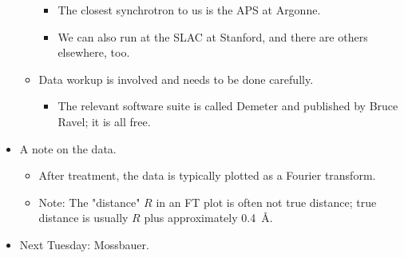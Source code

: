 \documentclass[../notes.tex]{subfiles}
\begin{document}
\begin{itemize}
\begin{itemize}
\begin{itemize}
            \item The closest synchrotron to us is the APS at Argonne.
            \item We can also run at the SLAC at Stanford, and there are others elsewhere, too.
        \end{itemize}
        \item Data workup is involved and needs to be done carefully.
        \begin{itemize}
            \item The relevant software suite is called Demeter and published by Bruce Ravel; it is all free.
        \end{itemize}
    \end{itemize}
    \item A note on the data.
    \begin{itemize}
        \item After treatment, the data is typically plotted as a Fourier transform.
        \item Note: The "distance" $R$ in an FT plot is often not true distance; true distance is usually $R$ plus approximately \SI{0.4}{\angstrom}.
    \end{itemize}
    \item Next Tuesday: Mossbauer.
\end{itemize}
\end{document}

